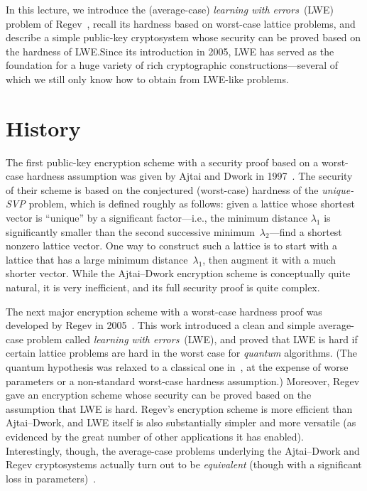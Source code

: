 \documentclass[11pt]{article}
\begin{document}
\thispagestyle{fancy} %


\newcommand{\Dist}{\calD}

In this lecture, we introduce the (average-case) \emph{learning with
  errors}~(LWE) problem of Regev~\cite{DBLP:journals/jacm/Regev09},
recall its hardness based on worst-case lattice problems, and describe
a simple public-key cryptosystem whose security can be proved based on
the hardness of LWE.\@ Since its introduction in 2005, LWE has served
as the foundation for a huge variety of rich cryptographic
constructions---several of which we still only know how to obtain from
LWE-like problems.

\section{History}
\label{sec:history}

The first public-key encryption scheme with a security proof based on
a worst-case hardness assumption was given by Ajtai and Dwork in
1997~\cite{DBLP:conf/stoc/AjtaiD97}. The security of their scheme is
based on the conjectured (worst-case) hardness of the
\emph{unique-SVP} problem, which is defined roughly as follows: given
a lattice whose shortest vector is ``unique'' by a significant
factor---i.e., the minimum distance $\lambda_{1}$ is significantly
smaller than the second successive minimum~$\lambda_{2}$---find a
shortest nonzero lattice vector. One way to construct such a lattice
is to start with a lattice that has a large minimum
distance~$\lambda_1$, then augment it with a much shorter vector.
While the Ajtai--Dwork encryption scheme is conceptually quite
natural, it is very inefficient, and its full security proof is quite
complex.

The next major encryption scheme with a worst-case hardness proof was
developed by Regev in 2005~\cite{DBLP:journals/jacm/Regev09}. This
work introduced a clean and simple average-case problem called
\emph{learning with errors}~(LWE), and proved that LWE is hard if
certain lattice problems are hard in the worst case for \emph{quantum}
algorithms. (The quantum hypothesis was relaxed to a classical one
in~\cite{DBLP:conf/stoc/Peikert09}, at the expense of worse parameters
or a non-standard worst-case hardness assumption.) Moreover, Regev
gave an encryption scheme whose security can be proved based on the
assumption that LWE is hard. Regev's encryption scheme is more
efficient than Ajtai--Dwork, and LWE itself is also substantially
simpler and more versatile (as evidenced by the great number of other
applications it has enabled). Interestingly, though, the average-case
problems underlying the Ajtai--Dwork and Regev cryptosystems actually
turn out to be \emph{equivalent} (though with a significant loss in
parameters)~\cite{DBLP:conf/coco/Regev10}.
\end{document}
